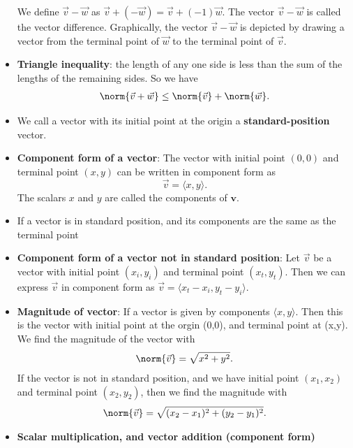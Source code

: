 \documentclass{report}
\begin{document}
\begin{itemize}
        We define $\vec{v} - \vec{w}$ as $\vec{v} + (-\vec{w}) = \vec{v} + (-1)\vec{w}$. The vector $\vec{v} - \vec{w}$ is called the vector difference. Graphically, the vector $\vec{v} - \vec{w}$ is depicted by drawing a vector from the terminal point of $\vec{w}$ to the terminal point of $\vec{v}$.
        \bigbreak \noindent 
    \item \textbf{Triangle inequality}: the length of any one side is less than the sum of the lengths of the remaining sides. So we have
        \begin{align*}
            \norm{\vec{v} + \vec{w}} \leq \norm{\vec{v}} + \norm{\vec{w}}
        .\end{align*}
    \item We call a vector with its initial point at the origin a \textbf{standard-position} vector.
    \item \textbf{Component form of a vector}:
        The vector with initial point $(0,0)$ and terminal point $(x,y)$ can be written in component form as
        \[
            \vec{v} = \langle x, y \rangle.
        \]
        The scalars $x$ and $y$ are called the components of $\mathbf{v}$.
    \item If a vector is in standard position, and its components are the same as the terminal point \textbf{}
    \item \textbf{Component form of a vector not in standard position}: 
        Let $\vec{v}$ be a vector with initial point $(x_i, y_i)$ and terminal point $(x_t, y_t)$. Then we can express $\vec{v}$ in component form as $\vec{v} = \langle x_t - x_i, y_t - y_i \rangle.$
    \item \textbf{Magnitude of vector}: If a vector is given by components $\langle x,y \rangle $. Then this is the vector with initial point at the orgin (0,0), and terminal point at (x,y). We find the magnitude of the vector with
        \begin{align*}
            \norm{\vec{v}} = \sqrt{x^{2} + y^{2}}
        .\end{align*}
        If the vector is not in standard position, and we have initial point $(x_{1}, x_{2})$ and terminal point $(x_{2}, y_{2})$, then we find the magnitude with 
        \begin{align*}
            \norm{\vec{v}} = \sqrt{(x_{2} - x_{1})^{2} + (y_{2} - y_{1})^{2}}
        .\end{align*}
    \item \textbf{Scalar multiplication, and vector addition (component form)}

\end{itemize}
\end{document}
